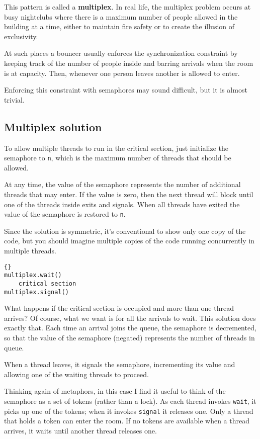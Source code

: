 \documentclass{book}
\newcommand{\clearemptydoublepage}{\newpage\cleardoublepage}
\begin{document}
This pattern is called a {\bf multiplex}.  In real life, the multiplex
problem occurs at busy nightclubs where there is a maximum number of
people allowed in the building at a time, either to maintain fire
safety or to create the illusion of exclusivity.

At such places a bouncer usually enforces the synchronization
constraint by keeping track of the number of people inside
and barring arrivals when the room is at capacity.  Then,
whenever one person leaves another is allowed to enter.

Enforcing this constraint with semaphores may sound difficult, but it
is almost trivial.


\clearemptydoublepage
\subsection{Multiplex solution}

To allow multiple threads to run in the critical section, just
initialize the semaphore to {\tt n}, which is the maximum number
of threads that should be allowed.

At any time, the value of the semaphore represents the
number of additional threads that may enter.  If the value is zero,
then the next thread will block until one of the threads inside
exits and signals.  When all threads have exited the value of the
semaphore is restored to {\tt n}.

Since the solution is symmetric, it's conventional to show only one
copy of the code, but you should imagine multiple copies of the code
running concurrently in multiple threads.

\begin{lstlisting}[title={Multiplex solution}]{}
multiplex.wait()
    critical section 
multiplex.signal()      
\end{lstlisting}

What happens if the critical section is occupied and more than one
thread arrives?  Of course, what we want is for all the arrivals to
wait.  This solution does exactly that.  Each time an arrival joins
the queue, the semaphore is decremented, so that the value of the
semaphore (negated) represents the number of threads in queue.

When a thread leaves, it signals the semaphore, incrementing
its value and allowing one of the waiting threads to proceed.

Thinking again of metaphors, in this case I find it useful
to think of the semaphore as a set of tokens (rather than
a lock).
As each thread invokes {\tt wait}, it picks up one of
the tokens; when it invokes {\tt signal} it releases one.
Only a thread that holds a token can enter the room.  If no
tokens are available when a thread arrives, it waits until
another thread releases one.
\end{document}

